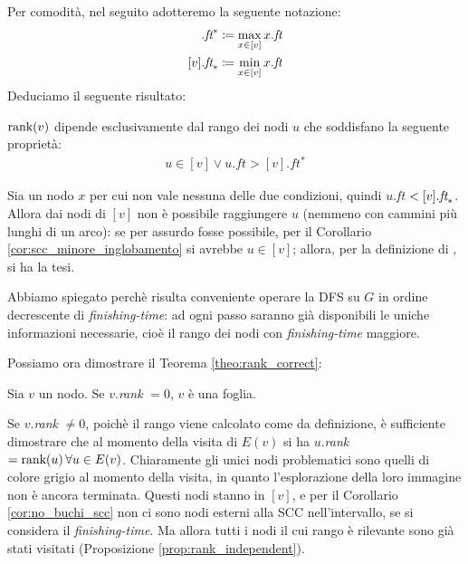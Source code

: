 Per comodità, nel seguito adotteremo la seguente notazione:
\begin{align*}
    [v].\emph{ft}^* &\coloneqq \max_{x \in [v]} x.\emph{ft}\\
    [v].\emph{ft}_* &\coloneqq \min_{x \in [v]} x.\emph{ft}
\end{align*}
Deduciamo il seguente risultato:
\begin{proposition}
    \label{prop:rank_independent}
    $\textup{rank}(v)$ dipende esclusivamente dal rango dei nodi $u$ che soddisfano la seguente proprietà:
    \begin{gather}
        u \in [v] \lor u.ft > [v].ft^* \label{rank_independency_formula}
    \end{gather}
\end{proposition}
\begin{proof2}
    Sia un nodo $x$ per cui non vale nessuna delle due condizioni, quindi $u$.\emph{ft} $< [v].\emph{ft}_*$. Allora dai nodi di $[v]$ non è possibile raggiungere $u$ (nemmeno con cammini più lunghi di un arco): se per assurdo fosse possibile, per il Corollario \ref{cor:scc_minore_inglobamento} si avrebbe $u \in [v]$; allora, per la definizione di \rankfunc, si ha la tesi.
\end{proof2}
Abbiamo spiegato perchè risulta conveniente operare la DFS su $G$ in ordine decrescente di \emph{finishing-time}: ad ogni passo saranno già disponibili le uniche informazioni necessarie, cioè il rango dei nodi con \emph{finishing-time} maggiore.

Possiamo ora dimostrare il Teorema \ref{theo:rank_correct}:
\begin{proof2}
    Sia $v$ un nodo. Se $v$.\emph{rank} $= 0$, $v$ è una foglia.

    Se $v$.\emph{rank} $\neq 0$, poichè il rango viene calcolato come da definizione, è sufficiente dimostrare che al momento della visita di $E(v)$ si ha $u$.\emph{rank} $= \textup{rank}(u) \,\forall u \in E(v)$. Chiaramente gli unici nodi problematici sono quelli di colore grigio al momento della visita, in quanto l'esplorazione della loro immagine non è ancora terminata. Questi nodi stanno in $[v]$, e per il Corollario \ref{cor:no_buchi_scc} non ci sono nodi esterni alla SCC nell'intervallo, se si considera il \emph{finishing-time}. Ma allora tutti i nodi il cui rango è rilevante sono già stati visitati (Proposizione \ref{prop:rank_independent}).
\end{proof2}


